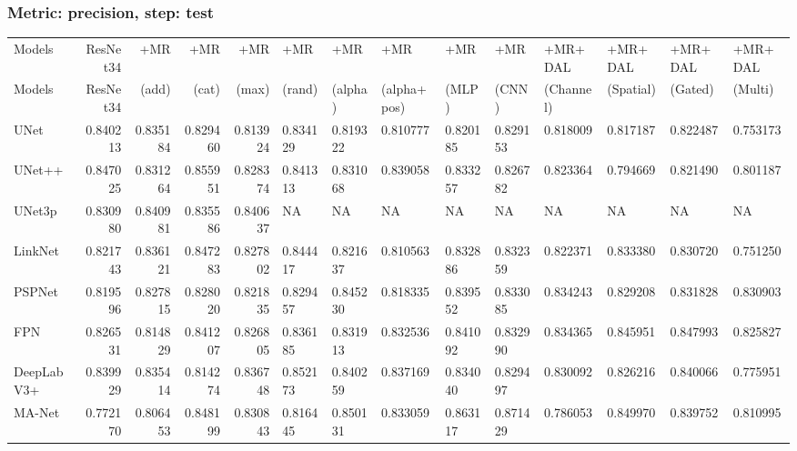 \documentclass{article}
\begin{document}
\subsubsection{Metric: precision, step: test}
\begin{tabular}{lrrrrlllllllll}
\toprule
Models & ResNet34 & +MR  & +MR  & +MR  & +MR  & +MR  & +MR  & +MR  & +MR  & +MR+DAL & +MR+DAL & +MR+DAL & +MR+DAL \\
Models & ResNet34 &  (add) &  (cat) &  (max) &  (rand) &  (alpha) &  (alpha+pos) &  (MLP) &  (CNN) & (Channel) & (Spatial) & (Gated) & (Multi) \\
\midrule
UNet & 0.840213 & 0.835184 & 0.829460 & 0.813924 & 0.834129 & 0.819322 & 0.810777 & 0.820185 & 0.829153 & 0.818009 & 0.817187 & 0.822487 & 0.753173 \\
UNet++ & 0.847025 & 0.831264 & 0.855951 & 0.828374 & 0.841313 & 0.831068 & 0.839058 & 0.833257 & 0.826782 & 0.823364 & 0.794669 & 0.821490 & 0.801187 \\
UNet3p & 0.830980 & 0.840981 & 0.835586 & 0.840637 & NA & NA & NA & NA & NA & NA & NA & NA & NA \\
LinkNet & 0.821743 & 0.836121 & 0.847283 & 0.827802 & 0.844417 & 0.821637 & 0.810563 & 0.832886 & 0.832359 & 0.822371 & 0.833380 & 0.830720 & 0.751250 \\
PSPNet & 0.819596 & 0.827815 & 0.828020 & 0.821835 & 0.829457 & 0.845230 & 0.818335 & 0.839552 & 0.833085 & 0.834243 & 0.829208 & 0.831828 & 0.830903 \\
FPN & 0.826531 & 0.814829 & 0.841207 & 0.826805 & 0.836185 & 0.831913 & 0.832536 & 0.841092 & 0.832990 & 0.834365 & 0.845951 & 0.847993 & 0.825827 \\
DeepLabV3+ & 0.839929 & 0.835414 & 0.814274 & 0.836748 & 0.852173 & 0.840259 & 0.837169 & 0.834040 & 0.829497 & 0.830092 & 0.826216 & 0.840066 & 0.775951 \\
MA-Net & 0.772170 & 0.806453 & 0.848199 & 0.830843 & 0.816445 & 0.850131 & 0.833059 & 0.863117 & 0.871429 & 0.786053 & 0.849970 & 0.839752 & 0.810995 \\
\bottomrule
\end{tabular}
\end{document}
